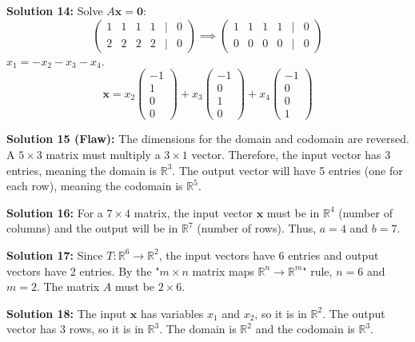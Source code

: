\documentclass{article}
\begin{document}
\textbf{Solution 14:}
Solve $A\mathbf{x} = \mathbf{0}$:
$$\begin{pmatrix} 1 & 1 & 1 & 1 & | & 0 \\ 2 & 2 & 2 & 2 & | & 0 \end{pmatrix} \implies \begin{pmatrix} 1 & 1 & 1 & 1 & | & 0 \\ 0 & 0 & 0 & 0 & | & 0 \end{pmatrix}$$
$x_1 = -x_2 - x_3 - x_4$. \\
$$\mathbf{x} = x_2 \begin{pmatrix} -1 \\ 1 \\ 0 \\ 0 \end{pmatrix} + x_3 \begin{pmatrix} -1 \\ 0 \\ 1 \\ 0 \end{pmatrix} + x_4 \begin{pmatrix} -1 \\ 0 \\ 0 \\ 1 \end{pmatrix}$$

\textbf{Solution 15 (Flaw):}
The dimensions for the domain and codomain are reversed. A $5 \times 3$ matrix must multiply a $3 \times 1$ vector. Therefore, the input vector has 3 entries, meaning the domain is $\mathbb{R}^3$. The output vector will have 5 entries (one for each row), meaning the codomain is $\mathbb{R}^5$. 

\textbf{Solution 16:}
For a $7 \times 4$ matrix, the input vector $\mathbf{x}$ must be in $\mathbb{R}^4$ (number of columns) and the output will be in $\mathbb{R}^7$ (number of rows). Thus, $a = 4$ and $b = 7$.

\textbf{Solution 17:}
Since $T: \mathbb{R}^6 \to \mathbb{R}^2$, the input vectors have 6 entries and output vectors have 2 entries. By the "$m \times n$ matrix maps $\mathbb{R}^n \to \mathbb{R}^m$" rule, $n=6$ and $m=2$. The matrix $A$ must be $2 \times 6$.

\textbf{Solution 18:}
The input $\mathbf{x}$ has variables $x_1$ and $x_2$, so it is in $\mathbb{R}^2$. The output vector has 3 rows, so it is in $\mathbb{R}^3$. The domain is $\mathbb{R}^2$ and the codomain is $\mathbb{R}^3$.
\end{document}
